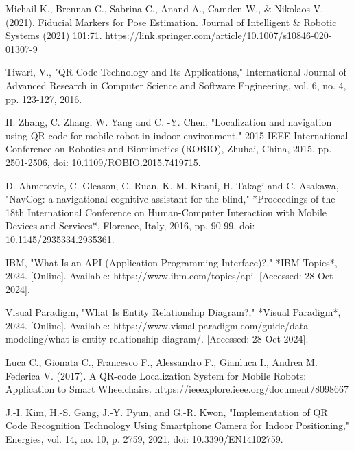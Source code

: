 
\newpage
{}
\renewcommand{\bibname}{References}

\begin{thebibliography}{9}
	Michail K., Brennan C., Sabrina C., Anand A., Camden W., \& Nikolaos
	V. (2021). Fiducial Markers for Pose Estimation. Journal of Intelligent \&
	Robotic Systems (2021) 101:71.
	https://link.springer.com/article/10.1007/s10846-020-01307-9
		
	 Tiwari, V., "QR Code Technology and Its Applications," International Journal of Advanced Research in Computer Science and Software Engineering, vol. 6, no. 4, pp. 123-127, 2016.
	
	H. Zhang, C. Zhang, W. Yang and C. -Y. Chen, "Localization and navigation using QR code for mobile robot in indoor environment," 2015 IEEE International Conference on Robotics and Biomimetics (ROBIO), Zhuhai, China, 2015, pp. 2501-2506, doi: 10.1109/ROBIO.2015.7419715.
	
	D. Ahmetovic, C. Gleason, C. Ruan, K. M. Kitani, H. Takagi and C. Asakawa, "NavCog: a navigational cognitive assistant for the blind," *Proceedings of the 18th International Conference on Human-Computer Interaction with Mobile Devices and Services*, Florence, Italy, 2016, pp. 90-99, doi: 10.1145/2935334.2935361.
	
	IBM, "What Is an API (Application Programming Interface)?," *IBM Topics*, 2024. [Online]. Available: https://www.ibm.com/topics/api. [Accessed: 28-Oct-2024].
	
	Visual Paradigm, "What Is Entity Relationship Diagram?," *Visual Paradigm*, 2024. [Online]. Available: https://www.visual-paradigm.com/guide/data-modeling/what-is-entity-relationship-diagram/. [Accessed: 28-Oct-2024].
	
	
	
	

	Luca C., Gionata C., Francesco F., Alessandro F., Gianluca I., Andrea M. Federica V. (2017). A QR-code Localization System for Mobile Robots: Application to Smart Wheelchairs.
	https://ieeexplore.ieee.org/document/8098667
	
	J.-I. Kim, H.-S. Gang, J.-Y. Pyun, and G.-R. Kwon, "Implementation of QR Code Recognition Technology Using Smartphone Camera for Indoor Positioning," Energies, vol. 14, no. 10, p. 2759, 2021, doi: 10.3390/EN14102759.
	

\end{thebibliography}
